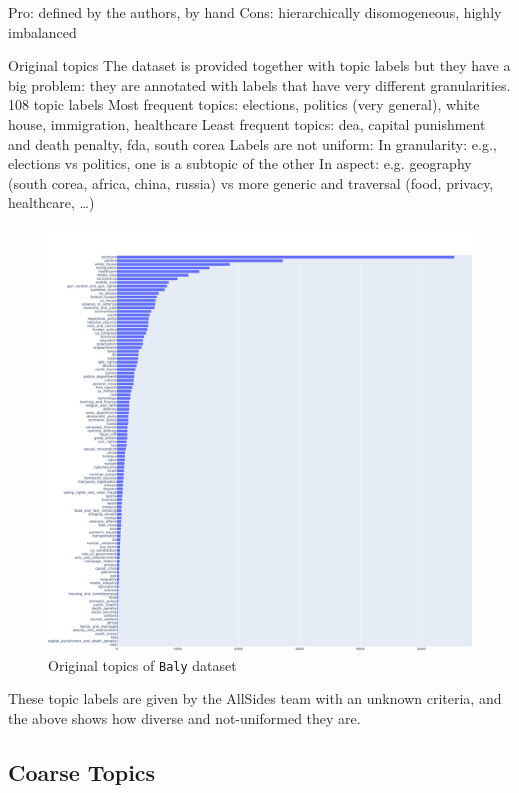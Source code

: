 Pro: defined by the authors, by hand
Cons: hierarchically disomogeneous, highly imbalanced

Original topics
The dataset is provided together with topic labels but they have a big problem: they are annotated with labels that have very different granularities.
108 topic labels
Most frequent topics: elections, politics (very general), white house, immigration, healthcare
Least frequent topics: dea, capital punishment and death penalty, fda, south corea
Labels are not uniform:
In granularity: e.g., elections vs politics, one is a subtopic of the other
In aspect: e.g. geography (south corea, africa, china, russia) vs more generic and traversal (food, privacy, healthcare, …)

\begin{figure}[!htbp]
    \centering
    \includegraphics[width=\linewidth]{figures/baly_original_topics.pdf}
    \caption{Original topics of \texttt{Baly} dataset}
    \label{fig:baly_original_topics}
\end{figure}

These topic labels are given by the AllSides team with an unknown criteria, and the above shows how diverse and not-uniformed they are.





\subsection{Coarse Topics}

